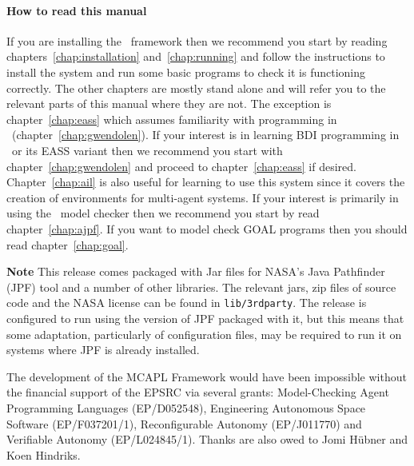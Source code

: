 \paragraph{How to read this manual}  If you are installing the \mcapl\ framework then we recommend you start by reading chapters~\ref{chap:installation} and~\ref{chap:running} and follow the instructions to install the system and run some basic programs to check it is functioning correctly.  The other chapters are mostly stand alone and will refer you to the relevant parts of this manual where they are not.  The exception is chapter~\ref{chap:eass} which assumes familiarity with programming in \gwendolen\ (chapter~\ref{chap:gwendolen}).  If your interest is in learning BDI programming in \gwendolen\ or its EASS variant then we recommend you start with chapter~\ref{chap:gwendolen} and proceed to chapter~\ref{chap:eass} if desired.  Chapter~\ref{chap:ail} is also useful for learning to use this system since it covers the creation of environments for multi-agent systems.  If your interest is primarily in using the \ajpf\ model checker then we recommend you start by read chapter~\ref{chap:ajpf}.  If you want to model check GOAL programs then you should read chapter~\ref{chap:goal}.

{\bf Note} This release comes packaged with Jar files for NASA's Java Pathfinder (JPF) tool and a number of other libraries.  The relevant jars, zip files of source code and the NASA license can be found in \texttt{lib/3rdparty}.  The release is configured to run using the version of JPF packaged with it, but this means that some adaptation, particularly of configuration files, may be required to run it on systems where JPF is already installed.

The development of the MCAPL Framework would have been impossible without the financial support of the EPSRC via several grants: Model-Checking Agent Programming Languages (EP/D052548), Engineering Autonomous Space Software (EP/F037201/1), Reconfigurable Autonomy (EP/J011770) and Verifiable Autonomy (EP/L024845/1).  Thanks are also owed to Jomi H\"{u}bner and Koen Hindriks.
